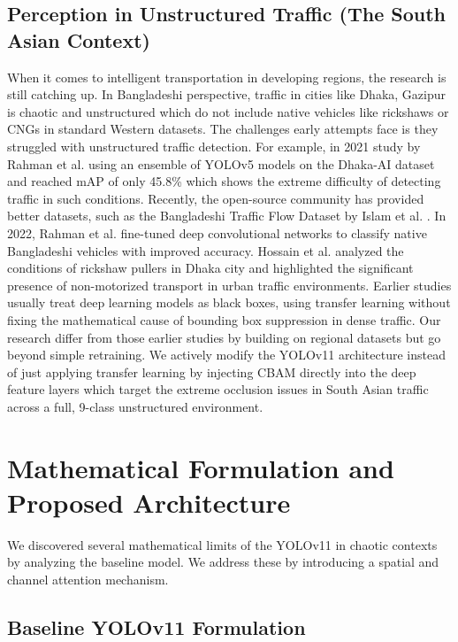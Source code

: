 \documentclass[sigconf]{acmart}
\begin{document}
\subsection{Perception in Unstructured Traffic (The South Asian Context)}
When it comes to intelligent transportation in developing regions, the research is still catching up. In Bangladeshi perspective, traffic in cities like Dhaka, Gazipur is chaotic and unstructured which do not include native vehicles like rickshaws or CNGs in standard Western datasets. The challenges early attempts face is they struggled with unstructured traffic detection. For example, in 2021 study by Rahman et al.\cite{rahman2021densely} using an ensemble of YOLOv5 models on the Dhaka-AI dataset and reached mAP of only 45.8\% which shows the extreme difficulty of detecting traffic in such conditions. Recently, the open-source community has provided better datasets, such as the Bangladeshi Traffic Flow Dataset by Islam et al. \cite{Islam2025BangladeshiTrafficFlow}. In 2022, Rahman et al.\cite{rahman2022fine} fine-tuned deep convolutional networks to classify native Bangladeshi vehicles with improved accuracy. Hossain et al.\cite{17a} analyzed the conditions of rickshaw pullers in Dhaka city and highlighted the significant presence of non-motorized transport in urban traffic environments. Earlier studies usually treat deep learning models as black boxes, using transfer learning without fixing the mathematical cause of bounding box suppression in dense traffic. Our research differ from those earlier studies by building on regional datasets but go beyond simple retraining. We actively modify the YOLOv11 architecture instead of just applying transfer learning by injecting CBAM directly into the deep feature layers which target the extreme occlusion issues in South Asian traffic across a full, 9-class unstructured environment.

\section{Mathematical Formulation and Proposed Architecture}
We discovered several mathematical limits of the YOLOv11 in chaotic contexts by analyzing the baseline model. We address these by introducing a spatial and channel attention mechanism. 


\subsection{Baseline YOLOv11 Formulation}
\end{document}

